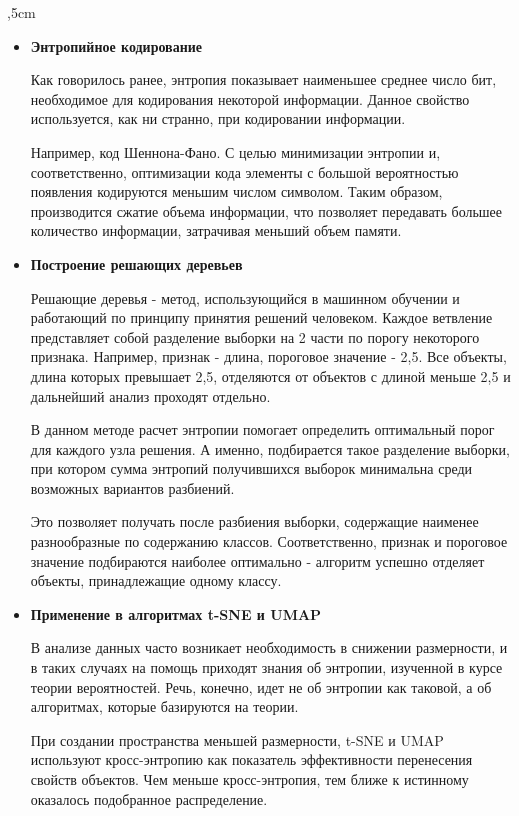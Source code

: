 \parskip=6pt
,5cm
\textwidth=17cm
\topmargin=-2cm
\pagestyle{plain}
\textheight=25cm


\begin{itemize}
	\item \textbf{Энтропийное кодирование}
	
	Как говорилось ранее, энтропия показывает наименьшее среднее число бит, необходимое для кодирования некоторой информации. Данное свойство используется, как ни странно, при кодировании информации.
	
	Например, код Шеннона-Фано. С целью минимизации энтропии и, соответственно, оптимизации кода элементы с большой вероятностью появления кодируются меньшим числом символом. Таким образом, производится сжатие объема информации, что позволяет передавать большее количество информации, затрачивая меньший объем памяти.
	
	\item \textbf{Построение решающих деревьев}
	
	Решающие деревья - метод, использующийся в машинном обучении и работающий по принципу принятия решений человеком. Каждое ветвление представляет собой разделение выборки на 2 части по порогу некоторого признака. Например, признак - длина, пороговое значение -  2,5. Все объекты, длина которых превышает 2,5, отделяются от объектов с длиной меньше 2,5 и дальнейший анализ проходят отдельно.
	
	В данном методе расчет энтропии помогает определить оптимальный порог для каждого узла решения. А именно, подбирается такое разделение выборки, при котором сумма энтропий получившихся выборок минимальна среди возможных вариантов разбиений.
	
	Это позволяет получать после разбиения выборки, содержащие наименее разнообразные по содержанию классов. Соответственно, признак и пороговое значение подбираются наиболее оптимально - алгоритм успешно отделяет объекты, принадлежащие одному классу.
	
	\item \textbf{Применение в алгоритмах t-SNE и UMAP}
	
	В анализе данных часто возникает необходимость в снижении размерности, и в таких случаях на помощь приходят знания об энтропии, изученной в курсе теории вероятностей. Речь, конечно, идет не об энтропии как таковой, а об алгоритмах, которые базируются на теории.
	
	При создании пространства меньшей размерности, t-SNE и UMAP используют кросс-энтропию как показатель эффективности перенесения свойств объектов. Чем меньше кросс-энтропия, тем ближе к истинному оказалось подобранное распределение.
	
	
\end{itemize}